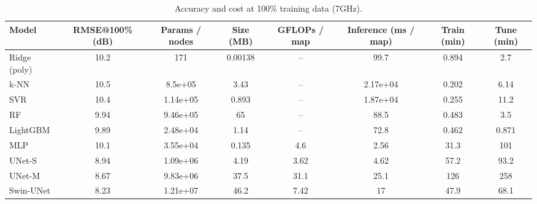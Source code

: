 \begin{table}[t]
\centering
\caption{Accuracy and cost at 100\% training data (7GHz).}
\begin{tabular}{lccccccc}
\hline
Model & RMSE@100\% (dB) & Params / nodes & Size (MB) & GFLOPs / map & Inference (ms / map) & Train (min) & Tune (min) \\
\hline
Ridge (poly) & 10.2 & 171 & 0.00138 & -- & 99.7 & 0.894 & 2.7 \\
k-NN & 10.5 & 8.5e+05 & 3.43 & -- & 2.17e+04 & 0.202 & 6.14 \\
SVR & 10.4 & 1.14e+05 & 0.893 & -- & 1.87e+04 & 0.255 & 11.2 \\
RF & 9.94 & 9.46e+05 & 65 & -- & 88.5 & 0.483 & 3.5 \\
LightGBM & 9.89 & 2.48e+04 & 1.14 & -- & 72.8 & 0.462 & 0.871 \\
MLP & 10.1 & 3.55e+04 & 0.135 & 4.6 & 2.56 & 31.3 & 101 \\
UNet-S & 8.94 & 1.09e+06 & 4.19 & 3.62 & 4.62 & 57.2 & 93.2 \\
UNet-M & 8.67 & 9.83e+06 & 37.5 & 31.1 & 25.1 & 126 & 258 \\
Swin-UNet & 8.23 & 1.21e+07 & 46.2 & 7.42 & 17 & 47.9 & 68.1 \\
\hline
\end{tabular}
\end{table}